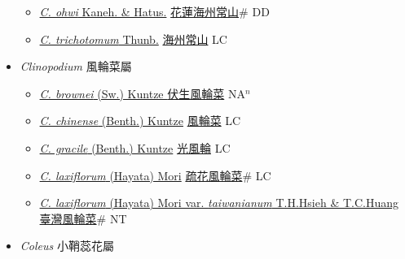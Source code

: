 \begin{itemize}
\begin{itemize}
        \item[] \href{http://www.theplantlist.org/tpl1.1/search?q=Clerodendrum+ohwi}{\textit{C. ohwi} Kaneh. \& Hatus.}   \href{\detokenize{http://taibnet.sinica.edu.tw/chi/taibnet_species_list.php?T2=花蓮海州常山&T2_new_value=true&fr=y}}{花蓮海州常山}\# DD
        \item[] \href{http://www.theplantlist.org/tpl1.1/search?q=Clerodendrum+trichotomum}{\textit{C. trichotomum} Thunb.}   \href{\detokenize{http://taibnet.sinica.edu.tw/chi/taibnet_species_list.php?T2=海州常山&T2_new_value=true&fr=y}}{海州常山} LC
  \end{itemize}
 \item[] \textit{Clinopodium} 風輪菜屬
                    
  \begin{itemize}
        \item[] \href{http://www.theplantlist.org/tpl1.1/search?q=Clinopodium+brownei}{\textit{C. brownei} (Sw.) Kuntze }   \href{\detokenize{http://taibnet.sinica.edu.tw/chi/taibnet_species_list.php?T2=伏生風輪菜&T2_new_value=true&fr=y}}{伏生風輪菜} NA$^n$
        \item[] \href{http://www.theplantlist.org/tpl1.1/search?q=Clinopodium+chinense}{\textit{C. chinense} (Benth.) Kuntze}   \href{\detokenize{http://taibnet.sinica.edu.tw/chi/taibnet_species_list.php?T2=風輪菜&T2_new_value=true&fr=y}}{風輪菜} LC
        \item[] \href{http://www.theplantlist.org/tpl1.1/search?q=Clinopodium+gracile}{\textit{C. gracile} (Benth.) Kuntze}   \href{\detokenize{http://taibnet.sinica.edu.tw/chi/taibnet_species_list.php?T2=光風輪&T2_new_value=true&fr=y}}{光風輪} LC
        \item[] \href{http://www.theplantlist.org/tpl1.1/search?q=Clinopodium+laxiflorum}{\textit{C. laxiflorum} (Hayata) Mori}   \href{\detokenize{http://taibnet.sinica.edu.tw/chi/taibnet_species_list.php?T2=疏花風輪菜&T2_new_value=true&fr=y}}{疏花風輪菜}\# LC
        \item[] \href{http://www.theplantlist.org/tpl1.1/search?q=Clinopodium+laxiflorum+var.+taiwanianum}{\textit{C. laxiflorum} (Hayata) Mori var. \textit{taiwanianum} T.H.Hsieh \& T.C.Huang}   \href{\detokenize{http://taibnet.sinica.edu.tw/chi/taibnet_species_list.php?T2=臺灣風輪菜&T2_new_value=true&fr=y}}{臺灣風輪菜}\# NT
  \end{itemize}
 \item[] \textit{Coleus} 小鞘蕊花屬
                    

\end{itemize}
